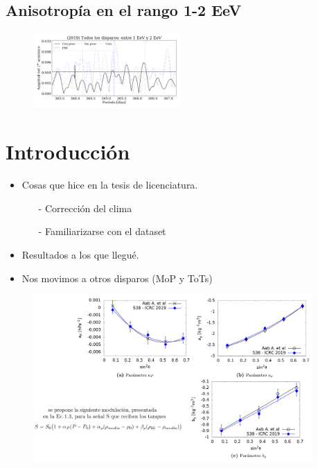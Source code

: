 \subsection{Anisotropía en el rango 1-2 EeV}

\begin{figure}[htbp]
	\centering
	\includegraphics[width=0.5\textwidth]{ani_corr.png}
\end{figure}






\section{Introducción}


\begin{itemize}
  \item Cosas que hice en la tesis de licenciatura.
  \begin{itemize}
  	\item[-] Corrección del clima
  	\item[-] Familiarizarse con el dataset
  \end{itemize}
  \item Resultados a los que llegué.
  \item Nos movimos a otros disparos (MoP y ToTs)
\end{itemize}

 


\begin{figure}[htbp]
  \centering
  \includegraphics[width=0.95\textwidth]{../beamer-07-05-2020/tesis.png}
\end{figure}

